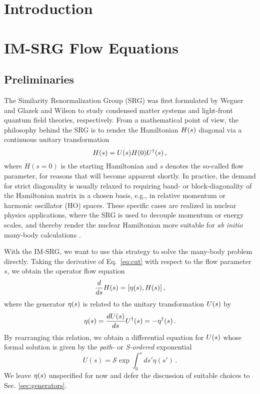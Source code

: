 \section{Introduction}

\section{\label{sec:floweq}IM-SRG Flow Equations}

\subsection{\label{sec:floweq_prelim}Preliminaries}
The Similarity Renormalization Group (SRG) was first formulated by Wegner \cite{Wegner:1994dk} and Glazek and Wilson \cite{Glazek:1993il} to study condensed matter systems and light-front quantum field theories, respectively.  From a mathematical point of view, the philosophy behind the SRG is to render the Hamiltonian $H(s)$ diagonal via a continuous unitary transformation 
\begin{equation}\label{eq:cut}
  \HO(s)=\UO(s)\HO(0)\UUO(s)\,,
\end{equation}
where $H(s=0)$ is the starting Hamiltonian and $s$ denotes the so-called flow
parameter, for reasons that will become apparent shortly. In practice, the demand 
for strict diagonality is usually relaxed to requiring band- or block-diagonality 
of the Hamiltonian matrix in a chosen basis, e.g., in relative momentum or harmonic
oscillator (HO) spaces. These specific cases are realized in nuclear
physics applications, where the SRG is used to decouple momentum or
energy scales, and thereby render the nuclear Hamiltonian more
suitable for \emph{ab initio} many-body calculations
\cite{Bogner:2007kt,Bogner:2010pq,Jurgenson:2009bs,Hebeler:2012ly}.

With the IM-SRG, we want to use this strategy to solve the many-body problem directly. Taking the derivative of Eq.~\eqref{eq:cut}
with respect to the flow parameter $s$, we obtain the operator flow equation
\begin{equation}\label{eq:opflow}
  \totd{}{s}\HO(s) = \comm{\etaO(s)}{\HO(s)}\,,
\end{equation} 
where the generator $\eta(s)$ is related to the unitary transformation $U(s)$ by
\begin{equation}
  \eta(s)= \frac{d {U(s)}} {d {s}} U^{\dag}(s) = -\eta^{\dag}(s)\,.
\end{equation}
By rearranging this relation, we obtain a differential equation for $U(s)$ whose formal solution is given by the \emph{path-}
or \emph{S-ordered} exponential
\begin{equation}
  U(s) = \mathcal{S}\exp \int^s_0 ds' \eta(s')\,.
\end{equation}
We leave $\eta(s)$ unspecified for now and defer the discussion of suitable choices to Sec. \ref{sec:generators}. 


